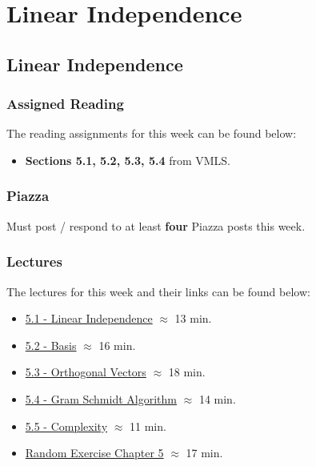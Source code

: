 \clearpage

\renewcommand{\ChapTitle}{Linear Independence}
\renewcommand{\SectionTitle}{Linear Independence}

\chapter{\ChapTitle}
\section{\SectionTitle}

\subsection{Assigned Reading}

The reading assignments for this week can be found below:

\begin{itemize}
    \item \textbf{Sections 5.1, 5.2, 5.3, 5.4} from VMLS.
\end{itemize}

\subsection{Piazza}

Must post / respond to at least \textbf{four} Piazza posts this week.  

\subsection{Lectures}

The lectures for this week and their links can be found below:

\begin{itemize}
    \item \href{https://applied.cs.colorado.edu/mod/hvp/view.php?id=50717}{5.1 - Linear Independence} $\approx$ 13 min.
    \item \href{https://applied.cs.colorado.edu/mod/hvp/view.php?id=50718}{5.2 - Basis} $\approx$ 16 min.
    \item \href{https://applied.cs.colorado.edu/mod/hvp/view.php?id=50719}{5.3 - Orthogonal Vectors} $\approx$ 18 min.
    \item \href{https://applied.cs.colorado.edu/mod/hvp/view.php?id=50720}{5.4 - Gram Schmidt Algorithm} $\approx$ 14 min.
    \item \href{https://applied.cs.colorado.edu/mod/hvp/view.php?id=50721}{5.5 - Complexity} $\approx$ 11 min.
    \item \href{https://applied.cs.colorado.edu/mod/hvp/view.php?id=50722}{Random Exercise Chapter 5} $\approx$ 17 min.
\end{itemize}

